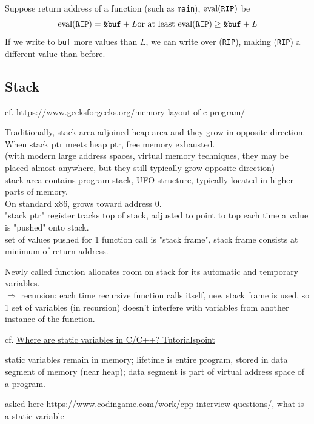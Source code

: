 \documentclass[10pt]{amsart}
\begin{document}
\begin{multicols*}{2}
Suppose return address of a function (such as \verb|main|), $\text{eval}(\verb|RIP|)$ be 
\[
\text{eval}(\verb|RIP|) = \verb|&buf| + L \text{or at least } \text{eval}(\verb|RIP|) \geq \verb|&buf| + L
\]
If we write to \verb|buf| more values than $L$, we can write over (\verb|RIP|), making (\verb|RIP|) a different value than before.  




\subsection{Stack}

cf. \url{https://www.geeksforgeeks.org/memory-layout-of-c-program/}

Traditionally, stack area adjoined heap area and they grow in opposite direction. \\
When stack ptr meets heap ptr, free memory exhausted. \\
(with modern large address spaces, virtual memory techniques, they may be placed almost anywhere, but they still typically grow opposite direction)  \\

stack area contains program stack, UFO structure, typically located in higher parts of memory. \\
On standard x86, grows toward address 0. \\
"stack ptr" register tracks top of stack, adjusted to point to top each time a value is "pushed" onto stack. \\
set of values pushed for 1 function call is "stack frame", stack frame consists at minimum of return address. 

Newly called function allocates room on stack for its automatic and temporary variables. \\
$\Longrightarrow$ recursion: each time recursive function calls itself, new stack frame is used, so 1 set of variables (in recursion) doesn't interfere with variables from another instance of the function. 

cf. \href{https://www.tutorialspoint.com/where-are-static-variables-stored-in-c-cplusplus}{Where are static variables in C/C++? Tutorialspoint}

static variables remain in memory; lifetime is entire program, stored in data segment of memory (near heap); data segment is part of virtual address space of a program.

asked here \url{https://www.codingame.com/work/cpp-interview-questions/}, what is a static variable



\end{multicols*}
\end{document}
